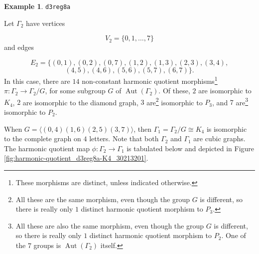 \documentclass[12pt,letterpaper]{article}
\theoremstyle{definition}
\newtheorem{example}[theorem]{Example}
\DeclareMathOperator{\Aut}{Aut}
\begin{document}
\begin{example}%
\label{example:d3reg8a}
   {\tt d3reg8a}\newline 
{\rm  
Let $\Gamma_2$ have vertices

\[
V_2=\{0,1,\dots,7\}
\]
and edges

\[
E_2 = \{(0, 1), (0, 2), (0, 7), (1, 2), (1, 3), (2, 3), (3, 4),
\]
\[
(4, 5), (4, 6), (5, 6), (5, 7), (6, 7)
\}.
\]
In this case, there are $14$ non-constant harmonic quotient
morphisms\footnote{These morphisms are distinct, unless indicated otherwise.}
$\pi: \Gamma_2\to \Gamma_2/G$, for some subgroup
$G$ of $\Aut(\Gamma_2)$. Of these, $2$ are isomorphic to $K_4$,
$2$ are isomorphic to the diamond graph,
$3$ are\footnote{All these are the same
morphism, even though the group $G$ is different, so there is
really only $1$ distinct harmonic quotient morphism to $P_3$.} isomorphic
to $P_3$, and $7$ are\footnote{All these are also the same
morphism, even though the group $G$ is different, so there is
really only $1$ distinct harmonic quotient morphism to $P_2$. One of the $7$ groups is $\Aut(\Gamma_2)$ itself.}
isomorphic to $P_2$.

When $G=\langle (0,4)(1,6)(2,5)(3,7)\rangle$, then
$\Gamma_1=\Gamma_2/G \cong K_4$ is isomorphic to the complete graph
on $4$ letters. Note that both $\Gamma_2$ and $\Gamma_1$ are
cubic graphs.
The harmonic quotient map $\phi:\Gamma_2\to \Gamma_1$ is tabulated below
and  depicted in Figure \ref{fig:harmonic-quotient_d3reg8a-K4_30213201}.

}
\end{example}
\end{document}
